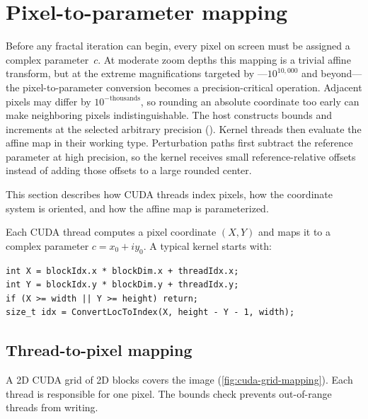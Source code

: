 \section{Pixel-to-parameter mapping}
\label{sec:mapping}

Before any fractal iteration can begin, every pixel on screen must be
assigned a complex parameter~$c$.  At moderate zoom depths this mapping is
a trivial affine transform, but at the extreme magnifications targeted by
\FractalShark{}---$10^{10{,}000}$ and beyond---the pixel-to-parameter
conversion becomes a precision-critical operation.  Adjacent pixels may
differ by $10^{-\text{thousands}}$, so rounding an absolute coordinate too early can
make neighboring pixels indistinguishable. The host constructs bounds and increments
at the selected arbitrary precision (). Kernel threads then
evaluate the affine map in their working type. Perturbation paths first subtract the
reference parameter at high precision, so the kernel receives small reference-relative
offsets instead of adding those offsets to a large rounded center.

This section describes how CUDA threads index pixels, how the coordinate
system is oriented, and how the affine map is parameterized.

Each CUDA thread computes a pixel coordinate \((X,Y)\) and maps it to a complex
parameter \(c = x_0 + i y_0\). A typical kernel starts with:
\begin{lstlisting}
int X = blockIdx.x * blockDim.x + threadIdx.x;
int Y = blockIdx.y * blockDim.y + threadIdx.y;
if (X >= width || Y >= height) return;
size_t idx = ConvertLocToIndex(X, height - Y - 1, width);
\end{lstlisting}

\subsection{Thread-to-pixel mapping}
A 2D CUDA grid of 2D blocks covers the image (\cref{fig:cuda-grid-mapping}).
Each thread is responsible for one pixel.
The bounds check prevents out-of-range threads from writing.

